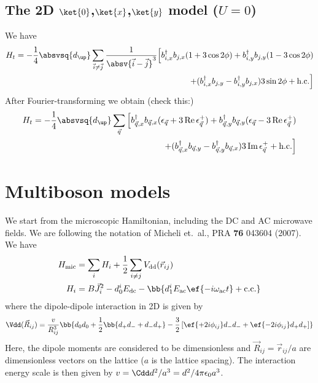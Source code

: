 \subsection{The 2D $\ket{0}$,$\ket{x}$,$\ket{y}$ model ($U=0$)}
\renewcommand\Re{\operatorname{\text{Re}}}
\renewcommand\Im{\operatorname{\text{Im}}}
We have
\begin{align*}
H_t=-\frac{1}{4}\absvsq{d_\up} \sum_{\vec{i}\ne\vec{j}}\frac{1}{\absv{\vec{i}-\vec{j}}^3}  \Big[ b_{i,x}^\dagger b_{j,x} (1+3\cos 2\phi) + b_{i,y}^\dagger b_{j,y} (1-3\cos 2 \phi) \\
+ (b_{i,x}^\dagger b_{j,y} - b_{i,y}^\dagger b_{j,x}) 3\sin 2\phi + \text{h.c.} \Big]
\end{align*}
After Fourier-transforming we obtain (check this:)
\begin{align*}
H_t=-\frac{1}{4}\absvsq{d_\up}\sum_{\vec{q}}  \Big[ b_{\vec{q},x}^\dagger b_{\vec{q},x} (\epsilon_{\vec{q}}+3\Re{\epsilon_{\vec{q}}^+}) + b_{\vec{q},y}^\dagger b_{\vec{q},y} (\epsilon_{\vec{q}}-3\Re{\epsilon_{\vec{q}}^+}) \\
+ (b_{\vec{q},x}^\dagger b_{\vec{q},y} - b_{\vec{q},y}^\dagger b_{\vec{q},x}) 3\Im{\epsilon_{\vec{q}}^+} + \text{h.c.} \Big]
\end{align*}

\newpage
\section{Multiboson models}
\newcommand{\Hmic}{H_\text{mic}}
We start from the microscopic Hamiltonian, including the DC and AC microwave fields. We are following the notation of Micheli et.~al., PRA \textbf{76} 043604 (2007). We have
\begin{align}
    \Hmic &= \sum_i H_i + \frac{1}{2}\sum_{i\ne j} V_\text{dd}(\vec{r}_{ij})\\
H_i &= B \vec{J}_i^2 - d_0^i E_\text{dc} - \bb{d_1^i E_\text{ac} \ef{-i\omega_\text{ac}t} + \text{c.c.}}
\end{align}
where the dipole-dipole interaction in 2D is given by
\begin{align}
\Vdd(\vec{R}_{ij})=\frac{v}{R_{ij}^3} \bb{d_0 d_0 + \frac{1}{2}\bb{d_+ d_- + d_- d_+} -\frac{3}{2} \left[ \ef{+2i\phi_{ij}} d_- d_- + \ef{-2i\phi_{ij}} d_+ d_+\right]}
\end{align}
Here, the dipole moments are considered to be dimensionless and $\vec{R}_{ij}=\vec{r}_{ij}/a$ are dimensionless vectors on the lattice ($a$ is the lattice spacing). The interaction energy scale is then given by $v=\Cdd d^2/a^3= d^2/4\pi\epsilon_0 a^3$.

